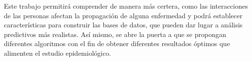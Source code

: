 Este trabajo permitirá comprender de manera más certera, como las interacciones de las personas afectan la propagación de alguna enfermedad y podrá establecer características para construir las bases de datos, que pueden dar lugar a análisis predictivos más realistas. Así mismo, se abre la puerta a que se propongan diferentes algoritmos con el fin de obtener diferentes resultados óptimos que alimenten el estudio epidemiológico. 